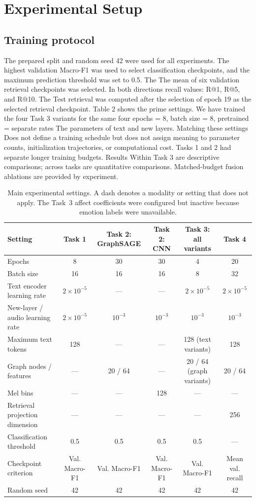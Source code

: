 \documentclass[10pt,twocolumn,letterpaper]{article}
\begin{document}
\section{Experimental Setup}
\subsection{Training protocol}
The prepared split and random seed 42 were used for all experiments. The highest validation Macro-F1 was used to select classification checkpoints, and the maximum prediction threshold was set to 0.5. The The mean of six validation retrieval checkpoints was selected. In both directions recall values: R@1, R@5, and R@10. The Test retrieval was computed after the selection of epoch 19 as the selected retrieval checkpoint. Table 2 shows the prime settings. We have trained the four Task 3 variants for the same four epochs = 8, batch size = 8, pretrained = separate rates The parameters of text and new layers. Matching these settings Does not define a training schedule but does not assign meaning to parameter counts, initialization trajectories, or computational cost. Tasks 1 and 2 had separate longer training budgets. Results Within Task 3 are descriptive comparisons; across tasks are quantitative comparisons. Matched-budget fusion ablations are provided by experiment.

\begin{table}[t]
\centering\small
\caption{Main experimental settings. A dash denotes a modality or setting that does not apply. The Task~3 affect coefficients were configured but inactive because emotion labels were unavailable.}
\label{tab:hyper}
\begin{tabular}{@{}lccccc@{}}
\toprule
Setting & Task 1 & Task 2: GraphSAGE & Task 2: CNN & Task 3: all variants & Task 4\\
\midrule
Epochs & 8 & 30 & 30 & 4 & 20\\
Batch size & 16 & 16 & 16 & 8 & 32\\
Text encoder learning rate & $2\!\times\!10^{-5}$ & --- & --- & $2\!\times\!10^{-5}$ & $2\!\times\!10^{-5}$\\
New-layer / audio learning rate & $2\!\times\!10^{-5}$ & $10^{-3}$ & $10^{-3}$ & $10^{-3}$ & $10^{-3}$\\
Maximum text tokens & 128 & --- & --- & 128 (text variants) & 128\\
Graph nodes / features & --- & 20 / 64 & --- & 20 / 64 (graph variants) & 20 / 64\\
Mel bins & --- & --- & 128 & --- & ---\\
Retrieval projection dimension & --- & --- & --- & --- & 256\\
Classification threshold & 0.5 & 0.5 & 0.5 & 0.5 & ---\\
Checkpoint criterion & Val. Macro-F1 & Val. Macro-F1 & Val. Macro-F1 & Val. Macro-F1 & Mean val. recall\\
Random seed & 42 & 42 & 42 & 42 & 42\\
\bottomrule
\end{tabular}
\end{table}
\end{document}
